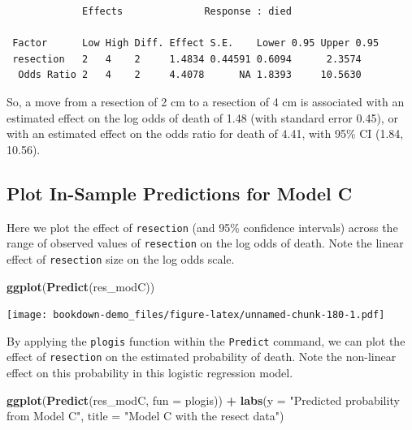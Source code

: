 \documentclass[]{book}
\newenvironment{Shaded}{\begin{snugshade}}{\end{snugshade}}
\newcommand{\KeywordTok}[1]{\textcolor[rgb]{0.13,0.29,0.53}{\textbf{#1}}}
\newcommand{\DataTypeTok}[1]{\textcolor[rgb]{0.13,0.29,0.53}{#1}}
\newcommand{\StringTok}[1]{\textcolor[rgb]{0.31,0.60,0.02}{#1}}
\newcommand{\OperatorTok}[1]{\textcolor[rgb]{0.81,0.36,0.00}{\textbf{#1}}}
\newcommand{\NormalTok}[1]{#1}
\theoremstyle{definition}
\theoremstyle{definition}
\theoremstyle{definition}
\theoremstyle{remark}
\begin{document}
\begin{verbatim}
             Effects              Response : died 

 Factor      Low High Diff. Effect S.E.    Lower 0.95 Upper 0.95
 resection   2   4    2     1.4834 0.44591 0.6094      2.3574   
  Odds Ratio 2   4    2     4.4078      NA 1.8393     10.5630   
\end{verbatim}

So, a move from a resection of 2 cm to a resection of 4 cm is associated
with an estimated effect on the log odds of death of 1.48 (with standard
error 0.45), or with an estimated effect on the odds ratio for death of
4.41, with 95\% CI (1.84, 10.56).

\subsection{Plot In-Sample Predictions for Model
C}\label{plot-in-sample-predictions-for-model-c}

Here we plot the effect of \texttt{resection} (and 95\% confidence
intervals) across the range of observed values of \texttt{resection} on
the log odds of death. Note the linear effect of \texttt{resection} size
on the log odds scale.

\begin{Shaded}
\begin{Highlighting}[]
\KeywordTok{ggplot}\NormalTok{(}\KeywordTok{Predict}\NormalTok{(res_modC))}
\end{Highlighting}
\end{Shaded}

\texttt{[image: bookdown-demo\_files/figure-latex/unnamed-chunk-180-1.pdf]}

By applying the \texttt{plogis} function within the \texttt{Predict}
command, we can plot the effect of \texttt{resection} on the estimated
probability of death. Note the non-linear effect on this probability in
this logistic regression model.

\begin{Shaded}
\begin{Highlighting}[]
\KeywordTok{ggplot}\NormalTok{(}\KeywordTok{Predict}\NormalTok{(res_modC, }\DataTypeTok{fun =}\NormalTok{ plogis)) }\OperatorTok{+}\StringTok{ }
\StringTok{    }\KeywordTok{labs}\NormalTok{(}\DataTypeTok{y =} \StringTok{"Predicted probability from Model C"}\NormalTok{,}
         \DataTypeTok{title =} \StringTok{"Model C with the resect data"}\NormalTok{)}
\end{Highlighting}
\end{Shaded}
\end{document}
